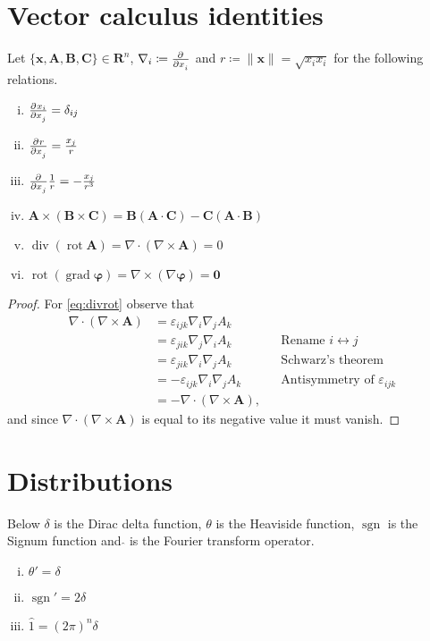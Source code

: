 \documentclass[a4paper, 11pt]{scrartcl}
\begin{document}
\section*{Vector calculus identities}

Let $\{\mathbf{x}, \mathbf{A}, \mathbf{B}, \mathbf{C}\} \in \mathbf{R}^n$, $\nabla_i \coloneqq \pd{}{x_i}$ and $r \coloneqq \|\mathbf{x}\| = \sqrt{x_i x_i}$ for the following relations.
\begin{enumerate}[(i)]
  \item $\pd{x_i}{x_j}=\delta_{ij}$
  \item $\pd{r}{x_j}=\frac{x_j}{r}$
  \item $\pd{}{x_j}\frac{1}{r}=-\frac{x_j}{r^3}$
  \item $\mathbf{A}\times(\mathbf{B}\times\mathbf{C}) = \mathbf{B}(\mathbf{A}\cdot\mathbf{C})-\mathbf{C}(\mathbf{A}\cdot\mathbf{B})$
  \item $\operatorname{div}(\operatorname{rot}\mathbf{A}) =
  \nabla\cdot(\nabla\times\mathbf{A}) = 0\label{eq:divrot}$
  \item $\operatorname{rot}(\operatorname{grad}\mathbf{\varphi}) =
  \nabla\times(\nabla\mathbf{\varphi}) = \mathbf{0}\label{eq:rotgrad}$
\end{enumerate}

\begin{proof}
  For \eqref{eq:divrot} observe that
  \begin{align*}
    \nabla\cdot(\nabla\times\mathbf{A})
    &= \varepsilon_{ijk} \nabla_i \nabla_j A_k \\
    &= \varepsilon_{jik} \nabla_j \nabla_i A_k
    && \text{Rename $i \leftrightarrow j$} \\
    &= \varepsilon_{jik} \nabla_i \nabla_j A_k
    && \text{Schwarz's theorem} \\
    &= -\varepsilon_{ijk} \nabla_i \nabla_j A_k
    && \text{Antisymmetry of $\varepsilon_{ijk}$} \\
    &= -\nabla\cdot(\nabla\times\mathbf{A}),
  \end{align*}
  and since $\nabla\cdot(\nabla\times\mathbf{A})$ is equal to its negative value it must vanish.
\end{proof}

\section*{Distributions}
Below $\delta$ is the Dirac delta function, $\theta$ is the Heaviside function, $\operatorname{sgn}$ is the Signum function and $\hat{}$ is the Fourier transform operator.
\begin{enumerate}[(i)]
  \item $\theta' = \delta$
  \item $\operatorname{sgn}' = 2\delta\label{eq:dsgn}$
  \item $\hat{1} = (2\pi)^n\delta$
\end{enumerate}
\end{document}
